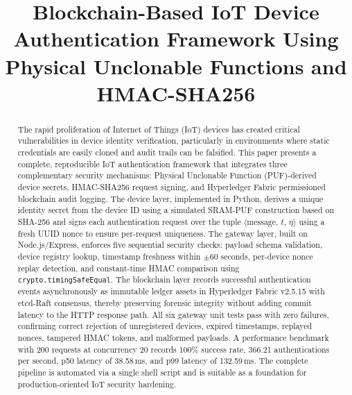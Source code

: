 \documentclass[conference]{IEEEtran}
\begin{document}
\title{Blockchain-Based IoT Device Authentication Framework Using\\
Physical Unclonable Functions and HMAC-SHA256}

\author{
}

\maketitle

\begin{abstract}
The rapid proliferation of Internet of Things (IoT) devices has created critical vulnerabilities in device identity verification, particularly in environments where static credentials are easily cloned and audit trails can be falsified. This paper presents a complete, reproducible IoT authentication framework that integrates three complementary security mechanisms: Physical Unclonable Function (PUF)-derived device secrets, HMAC-SHA256 request signing, and Hyperledger Fabric permissioned blockchain audit logging. The device layer, implemented in Python, derives a unique identity secret from the device ID using a simulated SRAM-PUF construction based on SHA-256 and signs each authentication request over the tuple $\langle\text{message},\,t,\,\eta\rangle$ using a fresh UUID nonce to ensure per-request uniqueness. The gateway layer, built on Node.js/Express, enforces five sequential security checks: payload schema validation, device registry lookup, timestamp freshness within $\pm60$ seconds, per-device nonce replay detection, and constant-time HMAC comparison using \texttt{crypto.timingSafeEqual}. The blockchain layer records successful authentication events asynchronously as immutable ledger assets in Hyperledger Fabric v2.5.15 with etcd-Raft consensus, thereby preserving forensic integrity without adding commit latency to the HTTP response path. All six gateway unit tests pass with zero failures, confirming correct rejection of unregistered devices, expired timestamps, replayed nonces, tampered HMAC tokens, and malformed payloads. A performance benchmark with 200 requests at concurrency 20 records 100\% success rate, 366.21 authentications per second, p50 latency of 38.58\,ms, and p99 latency of 132.59\,ms. The complete pipeline is automated via a single shell script and is suitable as a foundation for production-oriented IoT security hardening.
\end{abstract}
\end{document}

